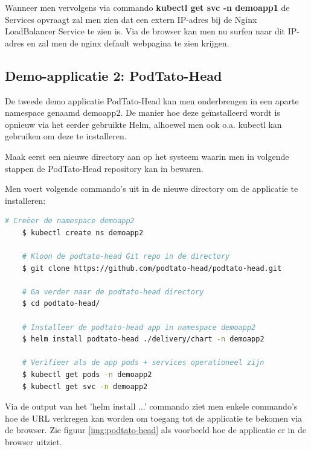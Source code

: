 Wanneer men vervolgens via commando {\bf kubectl get svc -n demoapp1} de Services opvraagt zal men zien dat een extern IP-adres bij de Nginx LoadBalancer Service te zien is. Via de browser kan men nu surfen naar dit IP-adres en zal men de nginx default webpagina te zien krijgen. 

\subsection{Demo-applicatie 2: PodTato-Head}
\label{subsec:podtato-setup}

De tweede demo applicatie PodTato-Head kan men onderbrengen in een aparte namespace genaamd demoapp2. De manier hoe deze geïnstalleerd wordt is opnieuw via het eerder gebruikte Helm, alhoewel men ook o.a. kubectl kan gebruiken om deze te installeren. \autocite{Gavant2022}

Maak eerst een nieuwe directory aan op het systeem waarin men in volgende stappen de PodTato-Head repository kan in bewaren. 

Men voert volgende commando's uit in de nieuwe directory om de applicatie te installeren:
\begin{lstlisting}[language=bash]
    # Creëer de namespace demoapp2
    $ kubectl create ns demoapp2
    
    # Kloon de podtato-head Git repo in de directory
    $ git clone https://github.com/podtato-head/podtato-head.git
    
    # Ga verder naar de podtato-head directory
    $ cd podtato-head/
    
    # Installeer de podtato-head app in namespace demoapp2
    $ helm install podtato-head ./delivery/chart -n demoapp2 
    
    # Verifieer als de app pods + services operationeel zijn
    $ kubectl get pods -n demoapp2
    $ kubectl get svc -n demoapp2
\end{lstlisting} 

Via de output van het 'helm install ...' commando ziet men enkele commando's hoe de URL verkregen kan worden om toegang tot de applicatie te bekomen via de browser.  \newline Zie figuur \ref{img:podtato-head} als voorbeeld hoe de applicatie er in de browser uitziet. 

